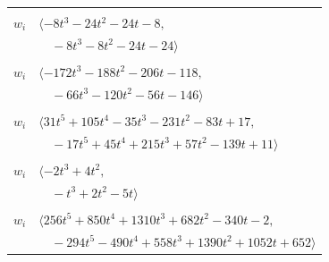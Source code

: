 \documentclass[11pt]{article}
\begin{document}
\begin{longtable}{@{}ll@{}}
\addlinespace[2pt]
\multicolumn{2}{@{}p{0.97\textwidth}@{}}{$i=20$, $D_i=4$, $\varphi_i=1$, $e_i=4$, $\rho_{ij}$: $2{:}1, \allowbreak 7{:}2, \allowbreak 15{:}2, \allowbreak 19{:}3, \allowbreak 33{:}1, \allowbreak 38{:}3, \allowbreak 45{:}3$}\\
$w_i$ & $\langle -8t^{3}-24t^{2}-24t-8,$\\
 & $\quad -8t^{3}-8t^{2}-24t-24\rangle$\\
\addlinespace[2pt]
\multicolumn{2}{@{}p{0.97\textwidth}@{}}{$i=21$, $D_i=1$, $\varphi_i=\tau(\Pi_{22})$, $\rho_{ij}$: $0{:}3, \allowbreak 1{:}1, \allowbreak 3{:}1, \allowbreak 4{:}3, \allowbreak 7{:}2, \allowbreak 9{:}2, \allowbreak 12{:}3, \allowbreak 25{:}3, \allowbreak 27{:}1, \allowbreak 32{:}2, \allowbreak 34{:}3, \allowbreak 38{:}3, \allowbreak 39{:}1, \allowbreak 43{:}1, \allowbreak 44{:}2, \allowbreak 45{:}2$}\\
$w_i$ & $\langle -172t^{3}-188t^{2}-206t-118,$\\
 & $\quad -66t^{3}-120t^{2}-56t-146\rangle$\\
\addlinespace[2pt]
\multicolumn{2}{@{}p{0.97\textwidth}@{}}{$i=23$, $D_i=1$, $\varphi_i=1$, $\rho_{ij}$: $9{:}1, \allowbreak 14{:}3, \allowbreak 15{:}3, \allowbreak 17{:}3, \allowbreak 18{:}1, \allowbreak 24{:}2, \allowbreak 31{:}1, \allowbreak 36{:}3, \allowbreak 44{:}1, \allowbreak 45{:}3, \allowbreak 46{:}3$}\\
$w_i$ & $\langle 31t^{5}+105t^{4}-35t^{3}-231t^{2}-83t+17,$\\
 & $\quad -17t^{5}+45t^{4}+215t^{3}+57t^{2}-139t+11\rangle$\\
\addlinespace[2pt]
\multicolumn{2}{@{}p{0.97\textwidth}@{}}{$i=24$, $D_i=1$, $\varphi_i=1$, $\rho_{ij}$: $13{:}2, \allowbreak 16{:}2, \allowbreak 22{:}2, \allowbreak 23{:}2, \allowbreak 35{:}2, \allowbreak 39{:}2$}\\
$w_i$ & $\langle -2t^{3}+4t^{2},$\\
 & $\quad -t^{3}+2t^{2}-5t\rangle$\\
\addlinespace[2pt]
\multicolumn{2}{@{}p{0.97\textwidth}@{}}{$i=25$, $D_i=1$, $\varphi_i=1$, $\rho_{ij}$: $8{:}1, \allowbreak 9{:}3, \allowbreak 12{:}3, \allowbreak 15{:}3, \allowbreak 18{:}3, \allowbreak 19{:}3, \allowbreak 21{:}1, \allowbreak 22{:}1, \allowbreak 26{:}1, \allowbreak 32{:}1, \allowbreak 37{:}3, \allowbreak 38{:}1, \allowbreak 40{:}1, \allowbreak 41{:}1, \allowbreak 45{:}1$}\\
$w_i$ & $\langle 256t^{5}+850t^{4}+1310t^{3}+682t^{2}-340t-2,$\\
 & $\quad -294t^{5}-490t^{4}+558t^{3}+1390t^{2}+1052t+652\rangle$\\

\end{longtable}
\end{document}
